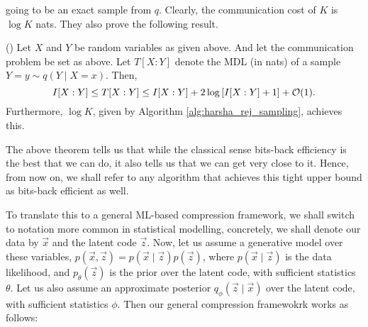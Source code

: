 going to be an exact sample from $q$. Clearly, the communication cost of $K$ is
$\log K$ nats. They also prove the following result.
\begin{theorem}{(\cite{harsha2007communication})}
Let $X$ and $Y$ be random variables as given above. And let the communication
problem be set as above. Let $T[X : Y]$ denote the MDL (in nats) of a sample
$Y=y \sim q(Y \mid X=x)$. Then,
\[
  I[X : Y] \leq T[X : Y] \leq I[X : Y] + 2\log \left[ I[X : Y] + 1 \right] + \mathcal{O}(1).
\]
Furthermore, $\log K$, given by Algorithm \ref{alg:harsha_rej_sampling},
achieves this.
\end{theorem}
\par
The above theorem tells us that while the classical sense bits-back efficiency
is the best that we can do, it also tells us that we can get very close to it.
Hence, from now on, we shall refer to any algorithm that achieves this tight
upper bound as bits-back efficient as well.
\par
To translate this to a general ML-based compression framework, we shall switch
to notation more common in statistical modelling, concretely, we shall denote
our data by $\vec{x}$ and the latent code $\vec{z}$. Now, let us assume a
generative model over these variables, $p(\vec{x}, \vec{z}) = p(\vec{x} \mid
\vec{z})p(\vec{z})$, where $p(\vec{x} \mid \vec{z})$ is the data likelihood, and
$p_\theta(\vec{z})$ is the prior over the latent code, with sufficient
statistics $\theta$. Let us also assume an approximate posterior $q_\phi(\vec{z}
\mid \vec{x})$ over the latent code, with sufficient statistics $\phi$. Then our
general compression framewokrk works as follows:
